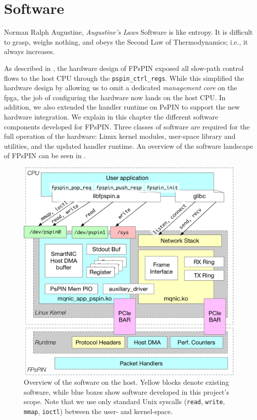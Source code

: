 \chapter{Software} \label{chap:software}
\begin{chapquote}{Norman Ralph Augustine, \textit{Augustine's Laws}}
Software is like entropy. It is difficult to grasp, weighs nothing, and obeys the Second Law of Thermodynamics; i.e., it always increases.
\end{chapquote}

As described in , the hardware design of FPsPIN exposed all slow-path control flows to the host CPU through the \texttt{pspin\_\-ctrl\_\-regs}.  While this simplified the hardware design by allowing us to omit a dedicated \emph{management core} on the \ac{fpga}, the job of configuring the hardware now lands on the host CPU.  In addition, we also extended the handler runtime on PsPIN to support the new hardware integration.  We explain in this chapter the different software components developed for FPsPIN.  Three classes of software are required for the full operation of the hardware: Linux kernel modules, user-space library and utilities, and the updated handler runtime.  An overview of the software landscape of FPsPIN can be seen in .

\begin{figure}
    \centering
    \includegraphics[width=.8\linewidth]{figures/sw-overview.pdf}
    \caption{Overview of the software on the host.  Yellow blocks denote existing software, while blue boxes show software developed in this project's scope.  Note that we use only standard Unix syscalls (\texttt{read}, \texttt{write}, \texttt{mmap}, \texttt{ioctl}) between the user- and kernel-space.} \label{fig:sw-overview}
\end{figure}

